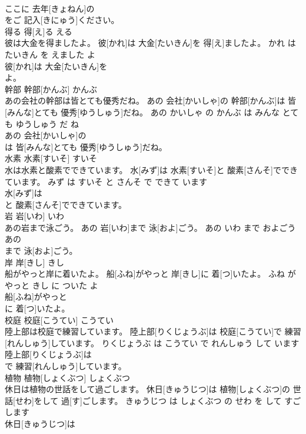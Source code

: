 \documentclass[8pt]{extreport}
\begin{document}
\begin{CJK}{UTF8}{min}
\\	ここに 去年[きょねん]の
\\	をご 記入[きにゅう]ください。			
\\	得る	得[え]る	える	
\\	彼は大金を得ましたよ。	彼[かれ]は 大金[たいきん]を 得[え]ましたよ。	かれ は たいきん を えました よ	
\\	彼[かれ]は 大金[たいきん]を
\\	よ。			
\\	幹部	幹部[かんぶ]	かんぶ	
\\	あの会社の幹部は皆とても優秀だね。	あの 会社[かいしゃ]の 幹部[かんぶ]は 皆[みんな]とても 優秀[ゆうしゅう]だね。	あの かいしゃ の かんぶ は みんな とても ゆうしゅう だ ね	
\\	あの 会社[かいしゃ]の
\\	は 皆[みんな]とても 優秀[ゆうしゅう]だね。			
\\	水素	水素[すいそ]	すいそ	
\\	水は水素と酸素でできています。	水[みず]は 水素[すいそ]と 酸素[さんそ]でできています。	みず は すいそ と さんそ で できて います	
\\	水[みず]は
\\	と 酸素[さんそ]でできています。			
\\	岩	岩[いわ]	いわ	
\\	あの岩まで泳ごう。	あの 岩[いわ]まで 泳[およ]ごう。	あの いわ まで およごう	
\\	あの
\\	まで 泳[およ]ごう。			
\\	岸	岸[きし]	きし	
\\	船がやっと岸に着いたよ。	船[ふね]がやっと 岸[きし]に 着[つ]いたよ。	ふね が やっと きし に ついた よ	
\\	船[ふね]がやっと
\\	に 着[つ]いたよ。			
\\	校庭	校庭[こうてい]	こうてい	
\\	陸上部は校庭で練習しています。	陸上部[りくじょうぶ]は 校庭[こうてい]で 練習[れんしゅう]しています。	りくじょうぶ は こうてい で れんしゅう して います	
\\	陸上部[りくじょうぶ]は
\\	で 練習[れんしゅう]しています。			
\\	植物	植物[しょくぶつ]	しょくぶつ	
\\	休日は植物の世話をして過ごします。	休日[きゅうじつ]は 植物[しょくぶつ]の 世話[せわ]をして 過[す]ごします。	きゅうじつ は しょくぶつ の せわ を して すごします	
\\	休日[きゅうじつ]は

\end{CJK}
\end{document}
